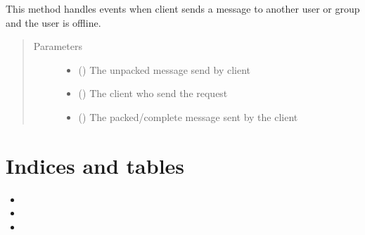 \documentclass[letterpaper,10pt,english]{sphinxmanual}
\begin{document}
\begin{fulllineitems}
\label{\detokenize{serverHelper:serverHelper.storeMsg}}
This method handles events when client sends a message to another user or group and the user is offline.
\begin{quote}\begin{description}
\item[{Parameters}] \leavevmode\begin{itemize}
\item {} 
 () \textendash{} The unpacked message send by client

\item {} 
 () \textendash{} The client who send the request

\item {} 
 () \textendash{} The packed/complete message sent by the client

\end{itemize}

\end{description}\end{quote}

\end{fulllineitems}



\chapter{Indices and tables}
\label{\detokenize{index:indices-and-tables}}\begin{itemize}
\item {} 

\item {} 

\item {} 

\end{itemize}


\renewcommand{\indexname}{Python Module Index}
\begin{sphinxtheindex}
\let\bigletter\sphinxstyleindexlettergroup
\bigletter{b}
\item\relax{}
\indexspace
\bigletter{c}
\item\relax{}
\indexspace
\bigletter{s}
\item\relax{}
\end{sphinxtheindex}

\renewcommand{\indexname}{Index}
\printindex
\end{document}
